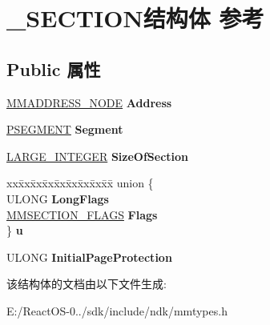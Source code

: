 \hypertarget{struct___s_e_c_t_i_o_n}{}\section{\+\_\+\+S\+E\+C\+T\+I\+O\+N结构体 参考}
\label{struct___s_e_c_t_i_o_n}
\subsection*{Public 属性}
\begin{DoxyCompactItemize}
\item 
\mbox{\label{struct___s_e_c_t_i_o_n_af813bc99120bd46c1a54de0f2491dfae}} 
\hyperlink{struct___m_m_a_d_d_r_e_s_s___n_o_d_e}{M\+M\+A\+D\+D\+R\+E\+S\+S\+\_\+\+N\+O\+DE} {\bfseries Address}
\item 
\mbox{\label{struct___s_e_c_t_i_o_n_a7476b7304e5e846ce63678c44d6c2ac3}} 
\hyperlink{struct___s_e_g_m_e_n_t}{P\+S\+E\+G\+M\+E\+NT} {\bfseries Segment}
\item 
\mbox{\label{struct___s_e_c_t_i_o_n_aff2045585d87e326b3fb8742d7fa1ff7}} 
\hyperlink{union___l_a_r_g_e___i_n_t_e_g_e_r}{L\+A\+R\+G\+E\+\_\+\+I\+N\+T\+E\+G\+ER} {\bfseries Size\+Of\+Section}
\item 
\mbox{\label{struct___s_e_c_t_i_o_n_a2144171f49b27ca1926c3c7238bd6404}} 
\begin{tabbing}
xx\=xx\=xx\=xx\=xx\=xx\=xx\=xx\=xx\=\kill
union \{\\
\>ULONG {\bfseries LongFlags}\\
\>\hyperlink{struct___m_m_s_e_c_t_i_o_n___f_l_a_g_s}{MMSECTION\_FLAGS} {\bfseries Flags}\\
\} {\bfseries u}\\

\end{tabbing}\item 
\mbox{\label{struct___s_e_c_t_i_o_n_ab119d5ad94d45ba3b7ceab4eb8fc48a7}} 
U\+L\+O\+NG {\bfseries Initial\+Page\+Protection}
\end{DoxyCompactItemize}


该结构体的文档由以下文件生成\+:\begin{DoxyCompactItemize}
\item 
E\+:/\+React\+O\+S-\/0../sdk/include/ndk/mmtypes.\+h\end{DoxyCompactItemize}
